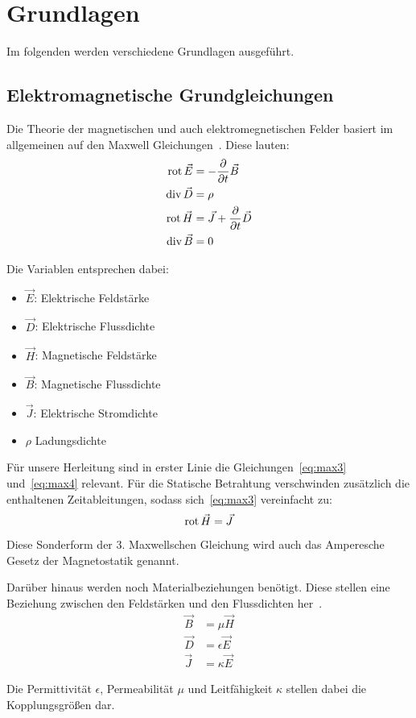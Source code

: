 \section{Grundlagen}
Im folgenden werden verschiedene Grundlagen ausgef\"uhrt.

\subsection{Elektromagnetische Grundgleichungen}
Die Theorie der magnetischen und auch elektromegnetischen Felder basiert im allgemeinen auf den Maxwell Gleichungen~\cite{maxwell1865viii}. Diese lauten:
\begin{align}
	\mathrm{rot}\, \vec{E} &= -\frac{\partial}{\partial t} \vec{B} \\
	\mathrm{div}\, \vec{D} &= \rho \\
	\mathrm{rot}\, \vec{H} &= \vec{J} + \frac{\partial}{\partial t}\vec{D} \label{eq:max3} \\
	\mathrm{div}\, \vec{B} &= 0 \label{eq:max4}
\end{align}
\par
Die Variablen entsprechen dabei:
\begin{itemize}
	\item $\vec{E}$: Elektrische Feldst\"arke
	\item $\vec{D}$: Elektrische Flussdichte
	\item $\vec{H}$: Magnetische Feldst\"arke
	\item $\vec{B}$: Magnetische Flussdichte
	\item $\vec{J}$: Elektrische Stromdichte
	\item $\rho$ Ladungsdichte
\end{itemize}
\par
F\"ur unsere Herleitung sind in erster Linie die Gleichungen~\ref{eq:max3} und~\ref{eq:max4} relevant. F\"ur die Statische Betrahtung verschwinden zus\"atzlich die enthaltenen Zeitableitungen, sodass sich~\ref{eq:max3} vereinfacht zu:
\begin{equation}
	\mathrm{rot}\, \vec{H} = \vec{J}
	\label{eq:amplaw}
\end{equation}
\par
Diese Sonderform der 3. Maxwellschen Gleichung wird auch das Amperesche Gesetz der Magnetostatik genannt.
\par
Dar\"uber hinaus werden noch Materialbeziehungen ben\"otigt. Diese stellen eine Beziehung zwischen den Feldst\"arken und den Flussdichten her~\cite{maxwell1865viii}.
\begin{align}
	\vec{B} &= \mu\vec{H} \\
	\vec{D} &= \epsilon\vec{E} \\
	\vec{J} &= \kappa\vec{E}
\end{align}
\par
Die Permittivit\"at $\epsilon$, Permeabilität $\mu$ und Leitf\"ahigkeit $\kappa$ stellen dabei die Kopplungsgr\"o\ss{}en dar.

